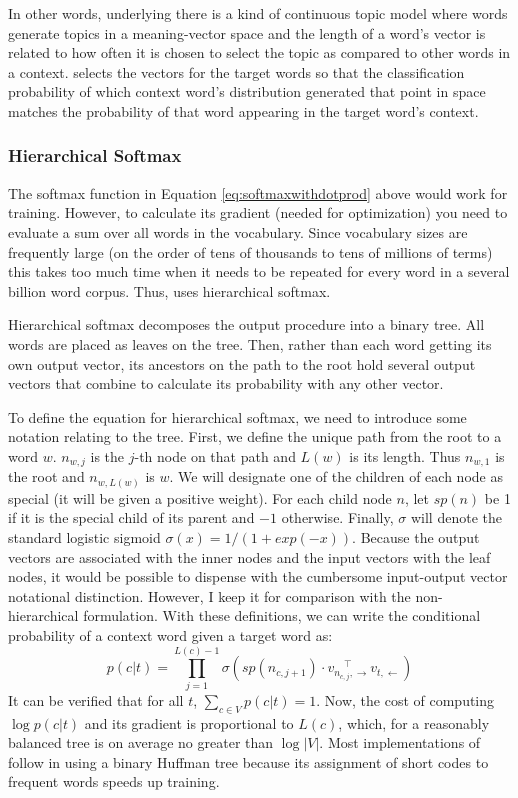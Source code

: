 In other words, underlying \modelname{} there is a kind of continuous topic 
model where words generate topics in a meaning-vector space and the length of
a word's vector is related to how often it is chosen to select the topic 
as compared to other words in a context. \modelname{} selects the vectors for 
the target words so that the classification probability of which context word's
distribution generated that point in space matches the probability of that word
appearing in the target word's context.


\subsubsection{Hierarchical Softmax}

The softmax function in Equation \ref{eq:softmaxwithdotprod} above would work 
for training. However, to calculate its 
gradient (needed for optimization) you need to evaluate a sum over all words
in the vocabulary. Since vocabulary sizes are frequently large (on the order of
tens of thousands to tens of millions of terms) this takes too much time when it
needs to be repeated for every word in a several billion word corpus. Thus, 
\modelname{} uses hierarchical softmax.

Hierarchical softmax decomposes the output procedure into a binary tree. All
words are placed as leaves on the tree. Then, rather than each word getting its 
own output vector, its ancestors on the path to the root hold several output
vectors that combine to calculate its probability with any other vector.

To define the equation for hierarchical softmax, we need to introduce some 
notation relating to the tree. First, we define the unique path from the root
to a word $w$. $n_{w,j}$ is the $j$-th node on that path and $L(w)$ is its
length. Thus $n_{w,1}$ is the root and $n_{w,L(w)}$ is $w$. We will designate
one of the children of each node as special (it will be given a positive 
weight). For each child node $n$, let $sp(n)$ be 1 if it is the special child
of its parent and $-1$ otherwise.
Finally, $\sigma$ will denote the standard logistic sigmoid 
$\sigma(x)=1/(1+exp(-x))$. Because 
the output vectors are associated with the inner nodes and the input vectors 
with the leaf nodes, it would be possible to dispense with the cumbersome 
input-output vector notational distinction. However, I keep it for 
comparison with the non-hierarchical formulation. With
these definitions, we can write the conditional probability of a context word
given a target word as:
%
\[p(c|t)=\prod_{j=1}^{L(c)-1} \sigma\left(sp\left(n_{c,j+1}\right)
\cdot v_{n_{c,j},\to}^{\quad\top} v_{t,\gets}\right)\]
%
It can be verified that for all $t$, $\sum_{c\in{}V}p(c|t)=1$. Now, the cost
of computing $\log p(c|t)$ and its gradient is proportional to $L(c)$, which, 
for a reasonably balanced tree is on average no greater than $\log |V|$. Most
implementations of \modelname{} follow \citep{Mikolov2013c} in using a binary
Huffman tree because its assignment of short codes to frequent words speeds
up training.

